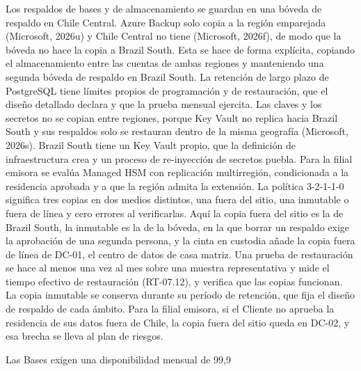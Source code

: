 \documentclass[11pt]{article}
\begin{document}
Los respaldos de bases y de almacenamiento se guardan en una bóveda de respaldo en Chile Central. Azure Backup solo copia a la región emparejada (Microsoft, 2026u) y Chile Central no tiene (Microsoft, 2026f), de modo que la bóveda no hace la copia a Brazil South. Esta se hace de forma explícita, copiando el almacenamiento entre las cuentas de ambas regiones y manteniendo una segunda bóveda de respaldo en Brazil South. La retención de largo plazo de PostgreSQL tiene límites propios de programación y de restauración, que el diseño detallado declara y que la prueba mensual ejercita. Las claves y los secretos no se copian entre regiones, porque Key Vault no replica hacia Brazil South y sus respaldos solo se restauran dentro de la misma geografía (Microsoft, 2026s). Brazil South tiene un Key Vault propio, que la definición de infraestructura crea y un proceso de re-inyección de secretos puebla. Para la filial emisora se evalúa Managed HSM con replicación multirregión, condicionada a la residencia aprobada y a que la región admita la extensión. La política 3-2-1-1-0 significa tres copias en dos medios distintos, una fuera del sitio, una inmutable o fuera de línea y cero errores al verificarlas. Aquí la copia fuera del sitio es la de Brazil South, la inmutable es la de la bóveda, en la que borrar un respaldo exige la aprobación de una segunda persona, y la cinta en custodia añade la copia fuera de línea de DC-01, el centro de datos de casa matriz. Una prueba de restauración se hace al menos una vez al mes sobre una muestra representativa y mide el tiempo efectivo de restauración (RT-07.12), y verifica que las copias funcionan. La copia inmutable se conserva durante su período de retención, que fija el diseño de respaldo de cada ámbito. Para la filial emisora, si el Cliente no aprueba la residencia de sus datos fuera de Chile, la copia fuera del sitio queda en DC-02, y esa brecha se lleva al plan de riesgos.

Las Bases exigen una disponibilidad mensual de 99,9 %
\end{document}
